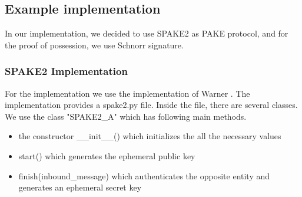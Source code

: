 \subsection{Example implementation}
In our implementation, we decided to use SPAKE2 as PAKE protocol, and for the
proof of possession, we use Schnorr signature.

\subsubsection{SPAKE2 Implementation} For the implementation we use the
implementation of Warner \cite{warner_spake2}. The implementation provides a
spake2.py file. Inside the file, there are several classes. We use the class
"SPAKE2\_A" which has following main methods.

\begin{itemize}
	\item the constructor \_\_init\_\_() which initializes the all the
		necessary values 
	\item start() which generates the ephemeral public key
	\item finish(inbound\_message) which authenticates the opposite entity and
		generates an ephemeral secret key
\end{itemize}

